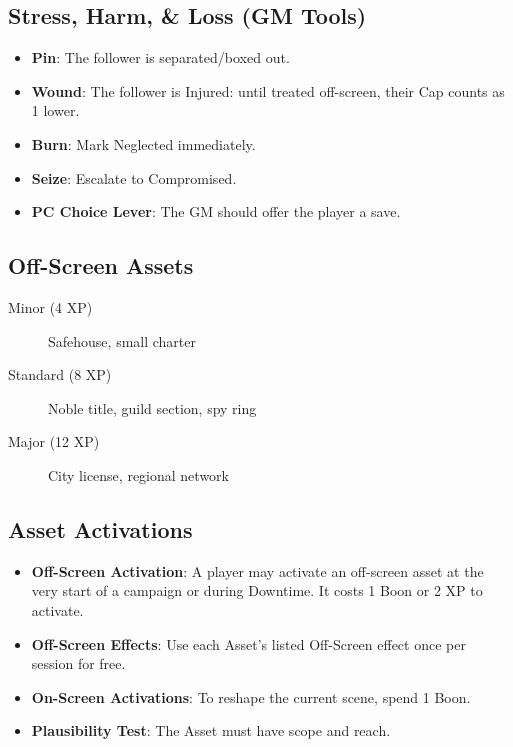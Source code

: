 \subsection{Stress, Harm, \& Loss (GM Tools)}
\begin{itemize}
    \item \textbf{Pin}: The follower is separated/boxed out.
    \item \textbf{Wound}: The follower is Injured: until treated off-screen, their Cap counts as 1 lower.
    \item \textbf{Burn}: Mark Neglected immediately.
    \item \textbf{Seize}: Escalate to Compromised.
    \item \textbf{PC Choice Lever}: The GM should offer the player a save.
\end{itemize}

\subsection{Off-Screen Assets}

\begin{description}
\item[Minor (4 XP)] Safehouse, small charter
\item[Standard (8 XP)] Noble title, guild section, spy ring
\item[Major (12 XP)] City license, regional network
\end{description}

\subsection{Asset Activations}
\begin{itemize}
    \item \textbf{Off-Screen Activation}: A player may activate an off-screen asset at the very start of a campaign or during Downtime. It costs 1 Boon or 2 XP to activate.
    \item \textbf{Off-Screen Effects}: Use each Asset's listed Off-Screen effect once per session for free.
    \item \textbf{On-Screen Activations}: To reshape the current scene, spend 1 Boon.
    \item \textbf{Plausibility Test}: The Asset must have scope and reach.
\end{itemize}

